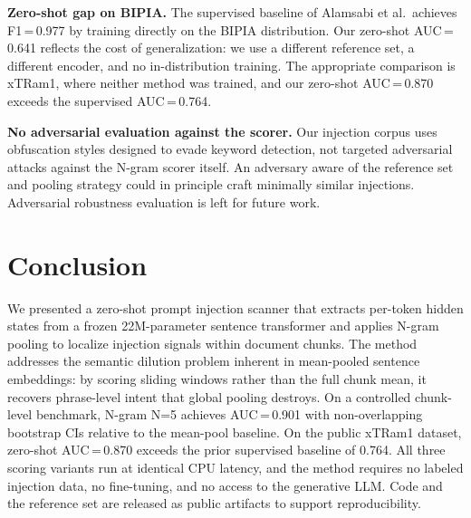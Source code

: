\documentclass[conference]{IEEEtran}
\begin{document}
\textbf{Zero-shot gap on BIPIA.} The supervised baseline of Alamsabi et al.\ achieves
F1\,=\,0.977 by training directly on the BIPIA distribution. Our zero-shot AUC\,=\,0.641
reflects the cost of generalization: we use a different reference set, a different
encoder, and no in-distribution training. The appropriate comparison is xTRam1, where
neither method was trained, and our zero-shot AUC\,=\,0.870 exceeds the supervised
AUC\,=\,0.764.

\textbf{No adversarial evaluation against the scorer.} Our injection corpus uses
obfuscation styles designed to evade keyword detection, not targeted adversarial
attacks against the N-gram scorer itself. An adversary aware of the reference set
and pooling strategy could in principle craft minimally similar injections. Adversarial
robustness evaluation is left for future work.

\section{Conclusion}
\label{sec:conclusion}

We presented a zero-shot prompt injection scanner that extracts per-token hidden states
from a frozen 22M-parameter sentence transformer and applies N-gram pooling to
localize injection signals within document chunks. The method addresses the semantic
dilution problem inherent in mean-pooled sentence embeddings: by scoring sliding
windows rather than the full chunk mean, it recovers phrase-level intent that global
pooling destroys. On a controlled chunk-level benchmark, N-gram N=5 achieves
AUC\,=\,0.901 with non-overlapping bootstrap CIs relative to the mean-pool baseline.
On the public xTRam1 dataset, zero-shot AUC\,=\,0.870 exceeds the prior supervised
baseline of 0.764. All three scoring variants run at identical CPU latency, and the
method requires no labeled injection data, no fine-tuning, and no access to the
generative LLM. Code and the reference set are released as public artifacts to support
reproducibility.



\end{document}
